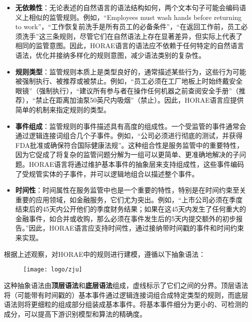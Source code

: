 \begin{itemize}
    \item \textbf{无依赖性}：无论表述的自然语言的语法结构如何，两个文本句子可能会编码语义上相似的监管规则。例如，“Employees must wash hands before returning to work”，“工作恢复前洗手是所有员工的必备条件”，“在返回工作前，员工必须洗手”这三条规则，尽管它们在自然语法上存在显著差异，但实际上代表了相同的监管意图。因此，HORAE语言的语法应不依赖于任何特定的自然语言语法，优化并接纳多样化的规则意图，减少语法类别的复杂性。
    \item \textbf{规则类型}：监管规则本质上是类型良好的，通常描述某些行为，这些行为可能被强制执行、被推荐或被禁止。例如，“员工必须在工厂地板上时始终戴安全眼镜”（强制执行），“建议所有参与者在操作任何机器之前查阅安全手册”（推荐），“禁止在距离加油泵50英尺内吸烟”（禁止）。因此，HORAE语言应提供简单的机制来指定规则的类型。
    \item \textbf{事件组成}：监管规则的事件描述具有高度的组成性。一个受监管的事件通常会通过逻辑连接词组合几个子事件。例如，“公司必须进行彻底的测试，并获得FDA批准或确保符合国际健康法规”。这种组合性是服务监管中的重要特性，因为它促成了将复杂的监管问题分解为一组可以更简单、更准确地解决的子问题。HORAE语言将通过维护基本事件的抽象层来支持组成性，这些事件编码了受规管实体的子事件，并可以逻辑地组合以描述整个事件。
    \item \textbf{时间性}：时间属性在服务监管中也是一个重要的特性，特别是在时间约束至关重要的应用领域，如金融服务，它们尤为突出。例如，“上市公司必须在季度结束后的45天内公开他们的季度财务结果；如果在这45天内发生了任何重大的金融事件，如合并或收购，那么必须在事件发生后的5天内提交额外的初步报告。”因此，HORAE语言应支持时间性，通过接纳带时间戳的事件和时间约束来实现。
\end{itemize}

根据上述观察，对HORAE中的规则进行建模，遵循以下抽象语法：

\begin{figure}[ht]
    \centering
    \texttt{[image: logo/zju]}
\end{figure}

这种抽象语法由\textbf{顶层语法}和\textbf{底层语法}组成，虚线标示了它们之间的分界。顶层语法将（可能带有时间戳的）基本事件通过逻辑连接词组合成特定类型的规则，而底层语法则将更细粒的组成部分组装成基本事件。将基本事件细分为更小的、可检测的成分，可以提高下游识别模型和算法的精确度。

